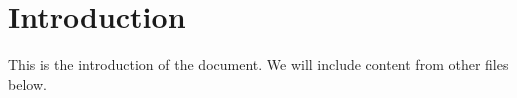 
\section{Introduction}
This is the introduction of the document. We will include content from other files below.